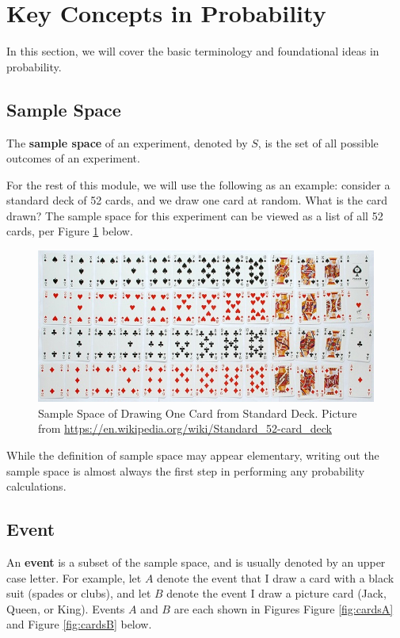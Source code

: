 \documentclass[
]{book}
\begin{document}
\hypertarget{probconcepts}{%
\section{Key Concepts in Probability}\label{probconcepts}}

In this section, we will cover the basic terminology and foundational ideas in probability.

\hypertarget{sample-space}{%
\subsection{Sample Space}\label{sample-space}}

The \textbf{sample space} of an experiment, denoted by \(S\), is the set of all possible outcomes of an experiment.

For the rest of this module, we will use the following as an example: consider a standard deck of 52 cards, and we draw one card at random. What is the card drawn? The sample space for this experiment can be viewed as a list of all 52 cards, per Figure \ref{fig:cards} below.

\begin{figure}
\centering
\includegraphics{images/02-cards.jpg}
\caption{\label{fig:cards}Sample Space of Drawing One Card from Standard Deck. Picture from \url{https://en.wikipedia.org/wiki/Standard_52-card_deck}}
\end{figure}

While the definition of sample space may appear elementary, writing out the sample space is almost always the first step in performing any probability calculations.

\hypertarget{event}{%
\subsection{Event}\label{event}}

An \textbf{event} is a subset of the sample space, and is usually denoted by an upper case letter. For example, let \(A\) denote the event that I draw a card with a black suit (spades or clubs), and let \(B\) denote the event I draw a picture card (Jack, Queen, or King). Events \(A\) and \(B\) are each shown in Figures Figure \ref{fig:cardsA} and Figure \ref{fig:cardsB} below.
\end{document}
